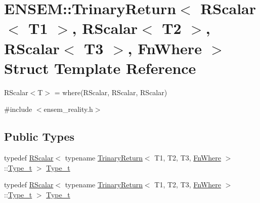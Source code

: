 \hypertarget{structENSEM_1_1TrinaryReturn_3_01RScalar_3_01T1_01_4_00_01RScalar_3_01T2_01_4_00_01RScalar_3_01T3_01_4_00_01FnWhere_01_4}{}\section{E\+N\+S\+EM\+:\+:Trinary\+Return$<$ R\+Scalar$<$ T1 $>$, R\+Scalar$<$ T2 $>$, R\+Scalar$<$ T3 $>$, Fn\+Where $>$ Struct Template Reference}
\label{structENSEM_1_1TrinaryReturn_3_01RScalar_3_01T1_01_4_00_01RScalar_3_01T2_01_4_00_01RScalar_3_01T3_01_4_00_01FnWhere_01_4}


R\+Scalar$<$\+T$>$ = where(\+R\+Scalar, R\+Scalar, R\+Scalar)  




{\ttfamily \#include $<$ensem\+\_\+reality.\+h$>$}

\subsection*{Public Types}
\begin{DoxyCompactItemize}
\item 
typedef \mbox{\hyperlink{classENSEM_1_1RScalar}{R\+Scalar}}$<$ typename \mbox{\hyperlink{structENSEM_1_1TrinaryReturn}{Trinary\+Return}}$<$ T1, T2, T3, \mbox{\hyperlink{structENSEM_1_1FnWhere}{Fn\+Where}} $>$\+::\mbox{\hyperlink{structENSEM_1_1TrinaryReturn_3_01RScalar_3_01T1_01_4_00_01RScalar_3_01T2_01_4_00_01RScalar_3_01T3_01_4_00_01FnWhere_01_4_ada2fb1fa55073f4129c8b9ecac068790}{Type\+\_\+t}} $>$ \mbox{\hyperlink{structENSEM_1_1TrinaryReturn_3_01RScalar_3_01T1_01_4_00_01RScalar_3_01T2_01_4_00_01RScalar_3_01T3_01_4_00_01FnWhere_01_4_ada2fb1fa55073f4129c8b9ecac068790}{Type\+\_\+t}}
\item 
typedef \mbox{\hyperlink{classENSEM_1_1RScalar}{R\+Scalar}}$<$ typename \mbox{\hyperlink{structENSEM_1_1TrinaryReturn}{Trinary\+Return}}$<$ T1, T2, T3, \mbox{\hyperlink{structENSEM_1_1FnWhere}{Fn\+Where}} $>$\+::\mbox{\hyperlink{structENSEM_1_1TrinaryReturn_3_01RScalar_3_01T1_01_4_00_01RScalar_3_01T2_01_4_00_01RScalar_3_01T3_01_4_00_01FnWhere_01_4_ada2fb1fa55073f4129c8b9ecac068790}{Type\+\_\+t}} $>$ \mbox{\hyperlink{structENSEM_1_1TrinaryReturn_3_01RScalar_3_01T1_01_4_00_01RScalar_3_01T2_01_4_00_01RScalar_3_01T3_01_4_00_01FnWhere_01_4_ada2fb1fa55073f4129c8b9ecac068790}{Type\+\_\+t}}
\end{DoxyCompactItemize}


